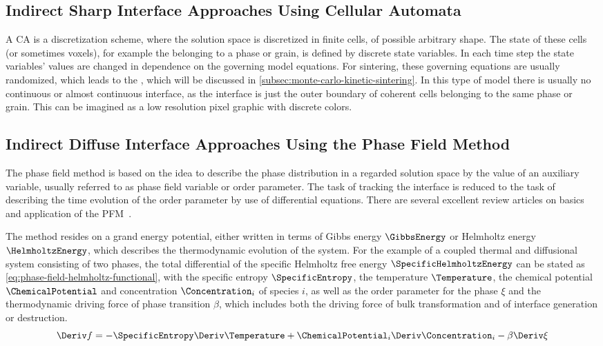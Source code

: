 \subsection{Indirect Sharp Interface Approaches Using Cellular Automata}\label{subsec:interfaces-cellular-automata}

A \gls{CA} is a discretization scheme, where the solution space is discretized in finite cells, of possible arbitrary shape.
The state of these cells (or sometimes voxels), for example the belonging to a phase or grain, is defined by discrete state variables.
In each time step the state variables' values are changed in dependence on the governing model equations.
For sintering, these governing equations are usually randomized, which leads to the , which will be discussed in \cref{subsec:monte-carlo-kinetic-sintering}.
In this type of model there is usually no continuous or almost continuous interface, as the interface is just the outer boundary of coherent cells belonging to the same phase or grain.
This can be imagined as a low resolution pixel graphic with discrete colors.

\subsection{Indirect Diffuse Interface Approaches Using the Phase Field Method}\label{subsec:interfaces-phase-field}

The phase field method is based on the idea to describe the phase distribution in a regarded solution space by the value of an auxiliary variable, usually referred to as phase field variable or order parameter.
The task of tracking the interface is reduced to the task of describing the time evolution of the order parameter by use of differential equations.
There are several excellent review articles on basics and application of the \gls{PFM}~\cite{Chen2022, Qin2010, Chen2002, Steinbach2009, Steinbach2013, Wang2010, Tonks2019}.

The method resides on a grand energy potential, either written in terms of Gibbs energy $\GibbsEnergy$ or Helmholtz energy $\HelmholtzEnergy$, which describes the thermodynamic evolution of the system.
For the example of a coupled thermal and diffusional system consisting of two phases, the total differential of the specific Helmholtz free energy $\SpecificHelmholtzEnergy$ can be stated as \cref{eq:phase-field-helmholtz-functional}, with the specific entropy $\SpecificEntropy$, the temperature $\Temperature$, the chemical potential $\ChemicalPotential$ and concentration $\Concentration_i$ of species $i$, as well as the order parameter for the phase $\xi$ and the thermodynamic driving force of phase transition $\beta$, which includes both the driving force of bulk transformation and of interface generation or destruction.
\begin{equation}
    \Deriv f = - \SpecificEntropy \Deriv \Temperature + \ChemicalPotential_i \Deriv \Concentration_i - \beta \Deriv \xi
    \label{eq:phase-field-helmholtz-functional}
\end{equation}

